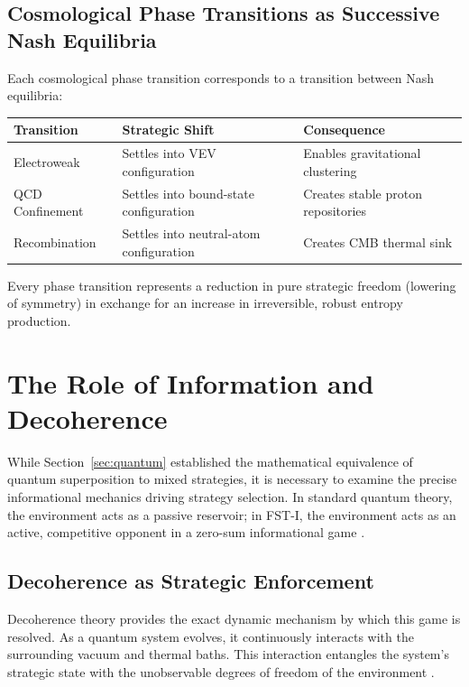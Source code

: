 \documentclass[12pt,a4paper]{article}
\theoremstyle{remark}
\begin{document}
\subsection{Cosmological Phase Transitions as Successive Nash Equilibria}

Each cosmological phase transition corresponds to a transition between Nash equilibria:

\begin{center}
\begin{tabular}{lll}
\toprule
\textbf{Transition} & \textbf{Strategic Shift} & \textbf{Consequence} \\
\midrule
Electroweak & Settles into VEV configuration & Enables gravitational clustering \\
QCD Confinement & Settles into bound-state configuration & Creates stable proton repositories \\
Recombination & Settles into neutral-atom configuration & Creates CMB thermal sink \\
\bottomrule
\end{tabular}
\end{center}

Every phase transition represents a reduction in pure strategic freedom (lowering of symmetry) in exchange for an increase in irreversible, robust entropy production.

\section{The Role of Information and Decoherence}
\label{sec:decoherence}

While Section~\ref{sec:quantum} established the mathematical equivalence of quantum superposition to mixed strategies, it is necessary to examine the precise informational mechanics driving strategy selection. In standard quantum theory, the environment acts as a passive reservoir; in FST-I, the environment acts as an active, competitive opponent in a zero-sum informational game \citep{Zurek2003}.

\subsection{Decoherence as Strategic Enforcement}

Decoherence theory provides the exact dynamic mechanism by which this game is resolved. As a quantum system evolves, it continuously interacts with the surrounding vacuum and thermal baths. This interaction entangles the system's strategic state with the unobservable degrees of freedom of the environment \citep{MeasurementClassical}.
\end{document}
